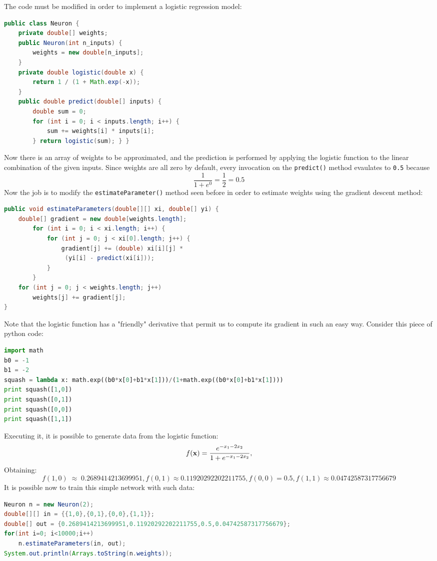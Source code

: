 \documentclass[10pt,a4paper]{article}
\begin{document}
The code must be modified in order to implement a logistic regression model:
\begin{lstlisting}[language=Java]
public class Neuron {
	private double[] weights;
	public Neuron(int n_inputs) {
		weights = new double[n_inputs];
	}
	private double logistic(double x) {
		return 1 / (1 + Math.exp(-x));
	}
	public double predict(double[] inputs) {
		double sum = 0;
		for (int i = 0; i < inputs.length; i++) {
			sum += weights[i] * inputs[i];
		} return logistic(sum); } }
\end{lstlisting}
Now there is an array of weights to be approximated, and the prediction is performed by applying the logistic function to the linear combination of the given inputs. Since weights are all zero by default, every invocation on the \texttt{predict()} method evaulates to \texttt{0.5} because
$$
\frac{1}{1+e^{0}} = \frac{1}{2} = 0.5
$$
Now the job is to modify the \texttt{estimateParameter()} method seen before in order to estimate weights using the gradient descent method:
\begin{lstlisting}[language=Java]
public void estimateParameters(double[][] xi, double[] yi) {
	double[] gradient = new double[weights.length];
		for (int i = 0; i < xi.length; i++) {
			for (int j = 0; j < xi[0].length; j++) {
				gradient[j] += (double) xi[i][j] *
				 (yi[i] - predict(xi[i]));
			}
		}
	for (int j = 0; j < weights.length; j++)
		weights[j] += gradient[j];
}
\end{lstlisting}
Note that the logistic function has a "friendly" derivative that permit us to compute its gradient in such an easy way. 
Consider this piece of python code:
\begin{lstlisting}[language=Python]
import math
b0 = -1
b1 = -2
squash = lambda x: math.exp((b0*x[0]+b1*x[1]))/(1+math.exp((b0*x[0]+b1*x[1])))
print squash([1,0])
print squash([0,1])
print squash([0,0])
print squash([1,1])
\end{lstlisting}
Executing it, it is possible to generate data from the logistic function:
$$
f(\textbf x) = \frac{e^{-x_1-2x_2}}{1+e^{-x_1-2x_2}},
$$
Obtaining:
$$
f(1,0) \;\approx\;0.2689414213699951, f(0,1) \approx 0.11920292202211755, f(0,0) = 0.5, f(1,1) \approx 0.04742587317756679
$$
It is possible now to train this simple network with such data:
\begin{lstlisting}[language=Java]
Neuron n = new Neuron(2);
double[][] in = {{1,0},{0,1},{0,0},{1,1}};
double[] out = {0.2689414213699951,0.11920292202211755,0.5,0.04742587317756679};
for(int i=0; i<10000;i++)
	n.estimateParameters(in, out);
System.out.println(Arrays.toString(n.weights));
\end{lstlisting}
\end{document}

